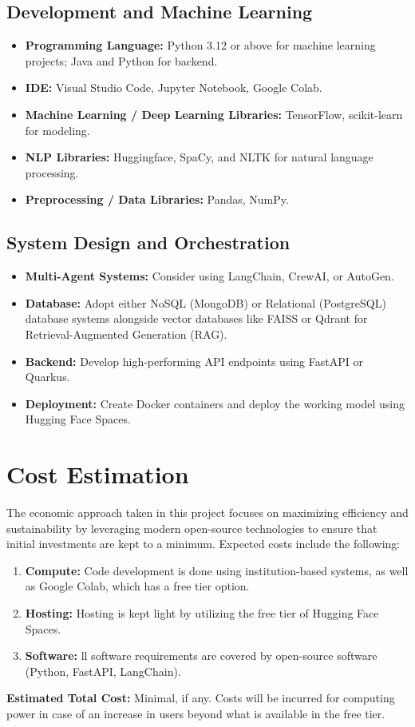 \subsection{Development and Machine Learning}
\begin{itemize}
	\item \textbf{Programming Language:} Python 3.12 or above for machine learning projects; Java and Python for backend.
	\item \textbf{IDE:} Visual Studio Code, Jupyter Notebook, Google Colab.
	\item \textbf{Machine Learning / Deep Learning Libraries:} TensorFlow, scikit-learn for modeling.
	\item \textbf{NLP Libraries:} Huggingface, SpaCy, and NLTK for natural language processing.
	\item \textbf{Preprocessing / Data Libraries:} Pandas, NumPy.
\end{itemize}

\subsection{System Design and Orchestration}
\begin{itemize}
	\item \textbf{Multi-Agent Systems:} Consider using LangChain, CrewAI, or AutoGen.
	\item \textbf{Database:} Adopt either NoSQL (MongoDB) or Relational (PostgreSQL) database systems alongside vector databases like FAISS or Qdrant for Retrieval-Augmented Generation (RAG).
	\item \textbf{Backend:} Develop high-performing API endpoints using FastAPI or Quarkus.
	\item \textbf{Deployment:} Create Docker containers and deploy the working model using Hugging Face Spaces.
\end{itemize}

\section{Cost Estimation}
The economic approach taken in this project focuses on maximizing efficiency and sustainability by leveraging modern open-source technologies to ensure that initial investments are kept to a minimum. Expected costs include the following:
\begin{enumerate}
	\item \textbf{Compute:} Code development is done using institution-based systems, as well as Google Colab, which has a free tier option.
	\item \textbf{Hosting:} Hosting is kept light by utilizing the free tier of Hugging Face Spaces.
	\item \textbf{Software:} ll software requirements are covered by open-source software (Python, FastAPI, LangChain).
\end{enumerate}
\textbf{Estimated Total Cost:} Minimal, if any. Costs will be incurred for computing power in case of an increase in users beyond what is available in the free tier.